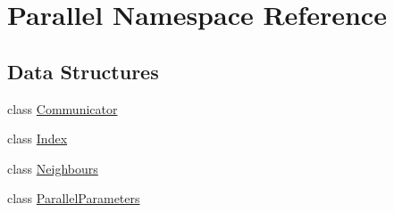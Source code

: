 \hypertarget{namespace_parallel}{}\section{Parallel Namespace Reference}
\label{namespace_parallel}
\subsection*{Data Structures}
\begin{DoxyCompactItemize}
\item 
class \mbox{\hyperlink{class_parallel_1_1_communicator}{Communicator}}
\item 
class \mbox{\hyperlink{class_parallel_1_1_index}{Index}}
\item 
class \mbox{\hyperlink{class_parallel_1_1_neighbours}{Neighbours}}
\item 
class \mbox{\hyperlink{class_parallel_1_1_parallel_parameters}{Parallel\+Parameters}}
\end{DoxyCompactItemize}
